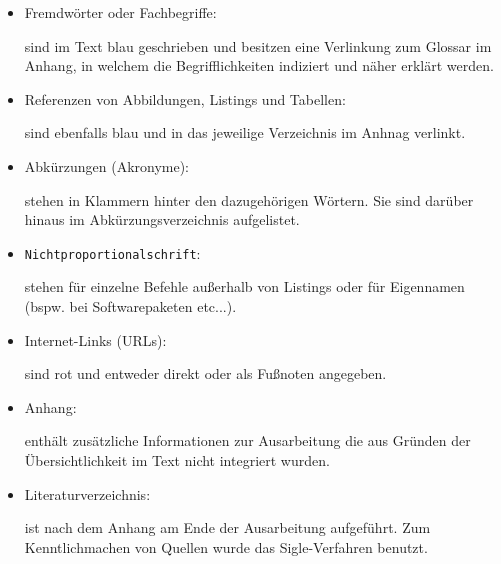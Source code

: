 \begin{itemize}
  \item Fremdwörter oder Fachbegriffe:

sind im Text blau geschrieben und besitzen eine Verlinkung zum Glossar im Anhang, in welchem die Begrifflichkeiten indiziert und näher erklärt werden.

  \item Referenzen von Abbildungen, Listings und Tabellen:
  
sind ebenfalls blau und in das jeweilige Verzeichnis im Anhnag verlinkt. 


  \item Abkürzungen (Akronyme):

stehen in Klammern hinter den dazugehörigen Wörtern. Sie sind darüber hinaus im Abkürzungsverzeichnis aufgelistet.

  \item \texttt{Nichtproportionalschrift}:

stehen für einzelne Befehle außerhalb von Listings oder für Eigennamen (bspw. bei Softwarepaketen etc...).

  \item Internet-Links (URLs):

sind rot und entweder direkt oder als Fußnoten angegeben.

  \item Anhang:

enthält zusätzliche Informationen zur Ausarbeitung die aus Gründen der Übersichtlichkeit im Text nicht integriert wurden. 

  \item Literaturverzeichnis:

ist nach dem Anhang am Ende der Ausarbeitung aufgeführt. Zum Kenntlichmachen von Quellen wurde das Sigle-Verfahren benutzt.

\end{itemize}
